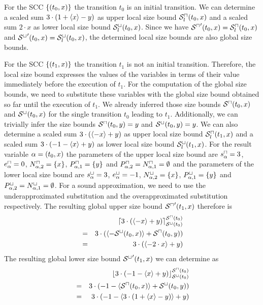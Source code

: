 For the SCC $\lbrace (t_0,x) \rbrace$ the transition $t_0$ is an initial transition.
We can determine a scaled sum $3 \cdot (1 + \langle x\rangle - y)$ as upper local size bound ${\mathcal{S}^\sqcap_l}(t_0,x)$ and a scaled sum $2 \cdot x$ as lower local size bound ${\mathcal{S}^\sqcup_l}(t_0,x)$.
Since we have ${\mathcal{S}^\sqcap}'(t_0,x) = {\mathcal{S}^\sqcap_l}(t_0,x)$ and ${\mathcal{S}^\sqcup}'(t_0,x) = {\mathcal{S}^\sqcup_l}(t_0,x)$, the determined local size bounds are also global size bounds.

For the SCC $\lbrace (t_1,x) \rbrace$ the transition $t_1$ is not an initial transition.
Therefore, the local size bound expresses the values of the variables in terms of their value immediately before the execution of $t_1$.
For the computation of the global size bounds, we need to substitute these variables with the global size bound obtained so far until the execution of $t_1$.
We already inferred those size bounds ${\mathcal{S}^\sqcap}(t_0,x)$ and ${\mathcal{S}^\sqcup}(t_0,x)$ for the single transition $t_0$ leading to $t_1$.
Additionally, we can trivially infer the size bounds ${\mathcal{S}^\sqcap}(t_0,y) = y$ and ${\mathcal{S}^\sqcup}(t_0,y) = y$.
We can also determine a scaled sum $3 \cdot (\langle-x\rangle + y)$ as upper local size bound ${\mathcal{S}^\sqcap_l}(t_1,x)$ and a scaled sum $3 \cdot (-1 - \langle x\rangle + y)$ as lower local size bound ${\mathcal{S}^\sqcup_l}(t_1,x)$.
For the result variable $\alpha = (t_0,x)$ the parameters of the upper local size bound are $s^\sqcap_\alpha = 3$, $e^\sqcap_\alpha = 0$, $N^\sqcap_{\alpha,2} = \lbrace x \rbrace$, $P^\sqcap_{\alpha,1} = \lbrace y \rbrace$ and $P^\sqcap_{\alpha,2} = N^\sqcap_{\alpha,1} = \emptyset$ and the parameters of the lower local size bound are $s^\sqcup_\alpha = 3$, $e^\sqcup_\alpha = -1$, $N^\sqcup_{\alpha,2} = \lbrace x \rbrace$, $P^\sqcup_{\alpha,1} = \lbrace y \rbrace$ and $P^\sqcup_{\alpha,2} = N^\sqcup_{\alpha,1} = \emptyset$.
For a sound approximation, we need to use the underapproximated substitution and the overapproximated substitution respectively.
The resulting global upper size bound ${\mathcal{S}^\sqcap}'(t_1,x)$ therefore is 
\begin{align*}
  && \lceil 3 \cdot \left( \langle-x\rangle + y \right)  \rceil^{{\mathcal{S}^\sqcap}(t_0)}_{{\mathcal{S}^\sqcup}(t_0)} \\
  & = & 3 \cdot \left( \langle-{\mathcal{S}^\sqcup}(t_0, x)\rangle + {\mathcal{S}^\sqcap}(t_0, y) \right) \\
  & = & 3 \cdot \left( \langle-2 \cdot x\rangle + y \right)
\end{align*}
The resulting global lower size bound ${\mathcal{S}^\sqcup}'(t_1,x)$ we can determine as
\begin{align*}
  && \lfloor 3 \cdot \left( -1 - \langle x\rangle + y \right)  \rfloor^{{\mathcal{S}^\sqcap}(t_0)}_{{\mathcal{S}^\sqcup}(t_0)} \\
  & = & 3 \cdot \left( -1 - \langle{\mathcal{S}^\sqcap}(t_0, x)\rangle + {\mathcal{S}^\sqcup}(t_0, y) \right) \\
  & = & 3 \cdot \left( -1 - \langle3 \cdot (1 + \langle x\rangle - y)\rangle + y \right)
\end{align*}
